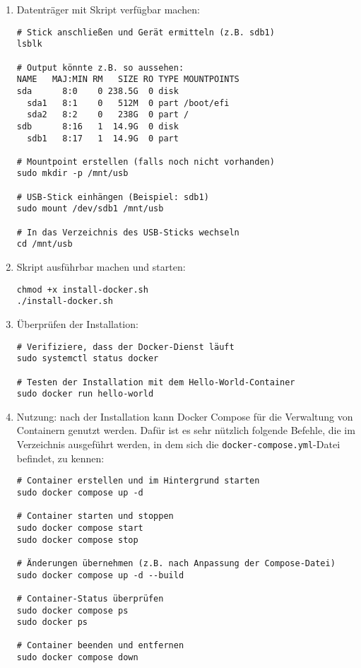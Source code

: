 \documentclass[12pt,a4paper]{report}
\begin{document}
  \begin{enumerate}
    \item Datenträger mit Skript verfügbar machen:
    \begin{verbatim}
# Stick anschließen und Gerät ermitteln (z.B. sdb1)
lsblk

# Output könnte z.B. so aussehen:
NAME   MAJ:MIN RM   SIZE RO TYPE MOUNTPOINTS
sda      8:0    0 238.5G  0 disk
  sda1   8:1    0   512M  0 part /boot/efi
  sda2   8:2    0   238G  0 part /
sdb      8:16   1  14.9G  0 disk
  sdb1   8:17   1  14.9G  0 part

# Mountpoint erstellen (falls noch nicht vorhanden)
sudo mkdir -p /mnt/usb

# USB-Stick einhängen (Beispiel: sdb1)
sudo mount /dev/sdb1 /mnt/usb

# In das Verzeichnis des USB-Sticks wechseln
cd /mnt/usb
    \end{verbatim}

    \item Skript ausführbar machen und starten:
    \begin{verbatim}
chmod +x install-docker.sh
./install-docker.sh
    \end{verbatim}

    \item Überprüfen der Installation:
    \begin{verbatim}
# Verifiziere, dass der Docker-Dienst läuft
sudo systemctl status docker

# Testen der Installation mit dem Hello-World-Container
sudo docker run hello-world
    \end{verbatim}
  
    \item Nutzung:
    nach der Installation kann Docker Compose für die Verwaltung von Containern genutzt werden.  
    Dafür ist es sehr nützlich folgende Befehle, die im Verzeichnis ausgeführt werden, 
    in dem sich die \texttt{docker-compose.yml}-Datei befindet, zu kennen:

    \begin{verbatim}
# Container erstellen und im Hintergrund starten
sudo docker compose up -d

# Container starten und stoppen
sudo docker compose start
sudo docker compose stop

# Änderungen übernehmen (z.B. nach Anpassung der Compose-Datei)
sudo docker compose up -d --build

# Container-Status überprüfen
sudo docker compose ps
sudo docker ps

# Container beenden und entfernen
sudo docker compose down
    \end{verbatim}
  \end{enumerate}
 
\end{document}
